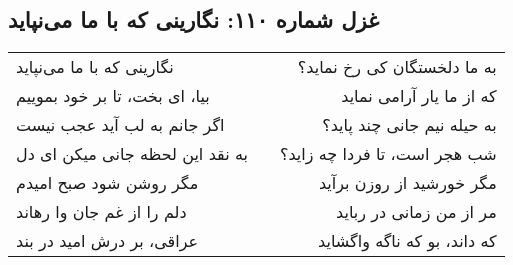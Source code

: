 \begin{center}
\section*{غزل شماره ۱۱۰: نگارینی که با ما می‌نپاید}
\label{sec:110}
\begin{longtable}{l p{0.5cm} r}
نگارینی که با ما می‌نپاید
&&
به ما دلخستگان کی رخ نماید؟
\\
بیا، ای بخت، تا بر خود بموییم
&&
که از ما یار آرامی نماید
\\
اگر جانم به لب آید عجب نیست
&&
به حیله نیم جانی چند پاید؟
\\
به نقد این لحظه جانی میکن ای دل
&&
شب هجر است، تا فردا چه زاید؟
\\
مگر روشن شود صبح امیدم
&&
مگر خورشید از روزن برآید
\\
دلم را از غم جان وا رهاند
&&
مر از من زمانی در رباید
\\
عراقی، بر درش امید در بند
&&
که داند، بو که ناگه واگشاید
\\
\end{longtable}
\end{center}
